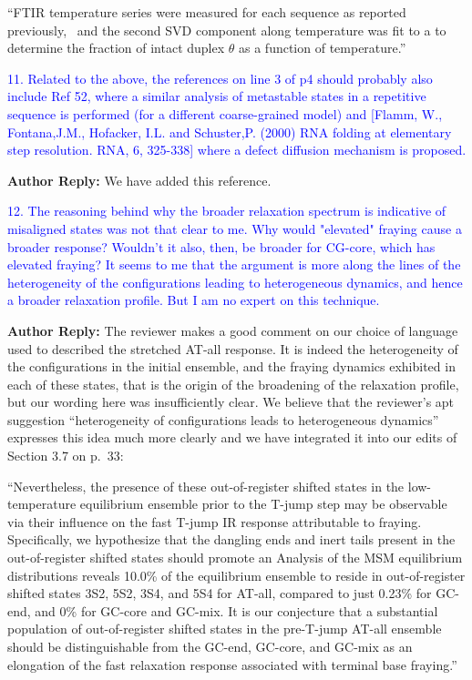 \documentclass[11pt,a4paper]{letter} %
\newcommand*{\rood}[1]{{\color{red}{#1}}}
\begin{document}
``FTIR temperature series were measured for each sequence as reported previously,~\citep{Sanstead2016} and the second SVD component along temperature was fit to a \rood{two-state model} to determine the fraction of intact duplex $\theta$ as a function of temperature.''



\textcolor{blue}{11. Related to the above, the references on line 3 of p4 should probably also include Ref 52, where a similar analysis of metastable states in a repetitive sequence is performed (for a different coarse-grained model) and [Flamm, W., Fontana,J.M., Hofacker, I.L. and Schuster,P. (2000) RNA folding at elementary step resolution. RNA, 6, 325-338] where a defect diffusion mechanism is proposed.
}

\textbf{Author Reply:}   We have added this reference.


\textcolor{blue}{12. The reasoning behind why the broader relaxation spectrum is indicative of misaligned states was not that clear to me. Why would "elevated" fraying cause a broader response? Wouldn't it also, then, be broader for CG-core, which has elevated fraying? It seems to me that the argument is more along the lines of the heterogeneity of the configurations leading to heterogeneous dynamics, and hence a broader relaxation profile. But I am no expert on this technique.}

\textbf{Author Reply:}   The reviewer makes a good comment on our choice of language used to described the stretched AT-all response. It is indeed the heterogeneity of the configurations in the initial ensemble, and the fraying dynamics exhibited in each of these states, that is the origin of the broadening of the relaxation profile, but our wording here was insufficiently clear. We believe that the reviewer's apt suggestion ``heterogeneity of configurations leads to heterogeneous dynamics'' expresses this idea much more clearly and we have integrated it into our edits of Section 3.7 on p.~33:

``Nevertheless, the presence of these out-of-register shifted states in the low-temperature equilibrium ensemble prior to the T-jump step may be observable via their influence on the fast T-jump IR response attributable to fraying. Specifically, we hypothesize that the dangling ends and inert tails present in the out-of-register shifted states should promote an \rood{elevated fraying response over the course of the relaxation that is distinct from that of in-register fraying. This heterogeneity of configurations should lead to heterogeneous dynamics, manifested in the observation of a more stretched relaxation over experimental time scales of 70-100 ns.} Analysis of the MSM equilibrium distributions reveals 10.0\% of the equilibrium ensemble to reside in out-of-register shifted states 3S2, 5S2, 3S4, and 5S4 for AT-all, compared to just 0.23\% for GC-end, and 0\% for GC-core and GC-mix. It is our conjecture that a substantial population of out-of-register shifted states in the pre-T-jump AT-all ensemble should be distinguishable from the GC-end, GC-core, and GC-mix as an elongation of the fast relaxation response associated with terminal base fraying.''
\end{document}
